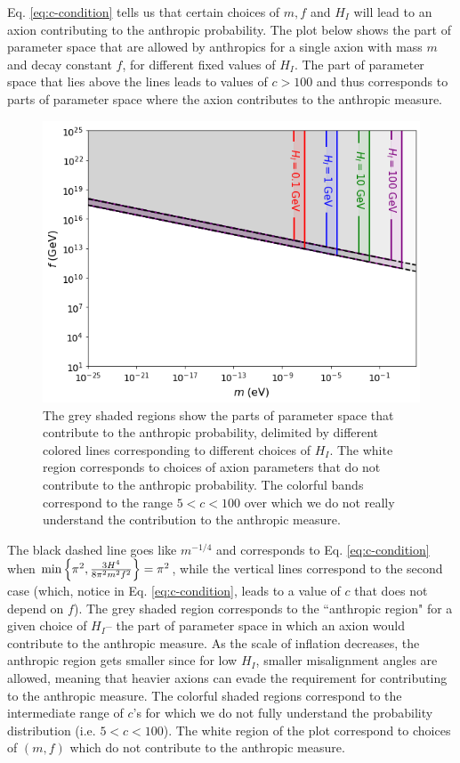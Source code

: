 \documentclass{article}
\begin{document}
Eq. \eqref{eq:c-condition} tells us that certain choices of $m, f$ and $H_I$ will lead to an axion contributing to the anthropic probability. The plot below shows the part of parameter space that are allowed by anthropics for a single axion with mass $m$ and decay constant $f$, for different fixed values of $H_I$. The part of parameter space that lies above the lines leads to values of $c>100$ and thus corresponds to parts of parameter space where the axion contributes to the anthropic measure.

\begin{figure}[h]
    \includegraphics[scale=0.6]{figs/f-vs-m-anthropic.png}
    \centering
    \caption{The grey shaded regions show the parts of parameter space that contribute to the anthropic probability, delimited by different colored lines corresponding to different choices of $H_I$. The white region corresponds to choices of axion parameters that do not contribute to the anthropic probability. The colorful bands correspond to the range $5<c<100$ over which we do not really understand the contribution to the anthropic measure.}
    \label{fig:f-vs-a}
\end{figure}

The black dashed line goes like $m^{-1/4}$ and corresponds to Eq. \eqref{eq:c-condition} when $\min{ \Bigl\{ \pi^2,\frac{3H^4}{8\pi^2m^2f^2}\Bigr\}} = \pi^2$, while the vertical lines correspond to the second case (which, notice in Eq. \eqref{eq:c-condition}, leads to a value of $c$ that does not depend on $f$). The grey shaded region corresponds to the ``anthropic region" for a given choice of $H_I$– the part of parameter space in which an axion would contribute to the anthropic measure. As the scale of inflation decreases, the anthropic region gets smaller since for low $H_I$, smaller misalignment angles are allowed, meaning that heavier axions can evade the requirement for contributing to the anthropic measure. The colorful shaded regions correspond to the intermediate range of $c$'s for which we do not fully understand the probability distribution (i.e. $5<c<100$). The white region of the plot correspond to choices of $(m,f)$ which do not contribute to the anthropic measure.
\end{document}
